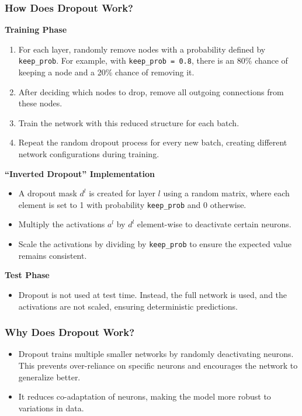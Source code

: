 \documentclass[letterpaper,12pt,notitlepage,twoside]{report}
\begin{document}
\subsubsection*{How Does Dropout Work?}
\textbf{Training Phase}
\begin{enumerate}
    \item For each layer, randomly remove nodes with a probability defined by \texttt{keep\_prob}. For example, with \texttt{keep\_prob = 0.8}, there is an 80\% chance of keeping a node and a 20\% chance of removing it.
    \item After deciding which nodes to drop, remove all outgoing connections from these nodes.
    \item Train the network with this reduced structure for each batch.
    \item Repeat the random dropout process for every new batch, creating different network configurations during training.
\end{enumerate}

\textbf{``Inverted Dropout'' Implementation}
\begin{itemize}
    \item A dropout mask \( d^l \) is created for layer \( l \) using a random matrix, where each element is set to 1 with probability \texttt{keep\_prob} and 0 otherwise.
    \item Multiply the activations \( a^l \) by \( d^l \) element-wise to deactivate certain neurons.
    \item Scale the activations by dividing by \texttt{keep\_prob} to ensure the expected value remains consistent.
\end{itemize}

\textbf{Test Phase}
\begin{itemize}
    \item Dropout is not used at test time. Instead, the full network is used, and the activations are not scaled, ensuring deterministic predictions.
\end{itemize}

\subsubsection*{Why Does Dropout Work?}
\begin{itemize}
    \item Dropout trains multiple smaller networks by randomly deactivating neurons. This prevents over-reliance on specific neurons and encourages the network to generalize better.
    \item It reduces co-adaptation of neurons, making the model more robust to variations in data.
\end{itemize}
\end{document}
